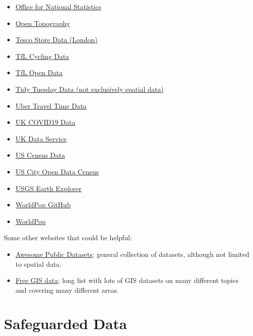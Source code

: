 \documentclass[
]{book}
\providecommand{\tightlist}{%
  \setlength{\itemsep}{0pt}\setlength{\parskip}{0pt}}
\begin{document}
\begin{itemize}
\item
  \href{https://www.ons.gov.uk/}{Office for National Statistics}
\item
  \href{https://opentopography.org/}{Open Topography}
\item
  \href{https://www.nature.com/articles/s41597-020-0397-7}{Tesco Store Data (London)}
\item
  \href{https://cycling.data.tfl.gov.uk/}{TfL Cycling Data}
\item
  \href{https://tfl.gov.uk/info-for/open-data-users/our-open-data?intcmp=3671\#on-this-page-2}{TfL Open Data}
\item
  \href{https://github.com/rfordatascience/tidytuesday}{Tidy Tuesday Data (not exclusively spatial data)}
\item
  \href{https://movement.uber.com/?lang=en-GB}{Uber Travel Time Data}
\item
  \href{https://coronavirus.data.gov.uk/}{UK COVID19 Data}
\item
  \href{https://ukdataservice.ac.uk/}{UK Data Service}
\item
  \href{https://www.census.gov/data.html}{US Census Data}
\item
  \href{http://us-cities.survey.okfn.org/}{US City Open Data Census}
\item
  \href{https://earthexplorer.usgs.gov/}{USGS Earth Explorer}
\item
  \href{https://github.com/wpgp}{WorldPop GitHub}
\item
  \href{https://www.worldpop.org/}{WorldPop}
\end{itemize}

Some other websites that could be helpful:

\begin{itemize}
\tightlist
\item
  \href{https://github.com/awesomedata/awesome-public-datasets}{Awesome Public Datasets}; general collection of datasets, although not limited to spatial data.
\item
  \href{https://freegisdata.rtwilson.com/}{Free GIS data}; long list with lots of GIS datasets on many different topics and covering many different areas.
\end{itemize}

\hypertarget{safeguarded-data}{%
\section{Safeguarded Data}\label{safeguarded-data}}
\end{document}
